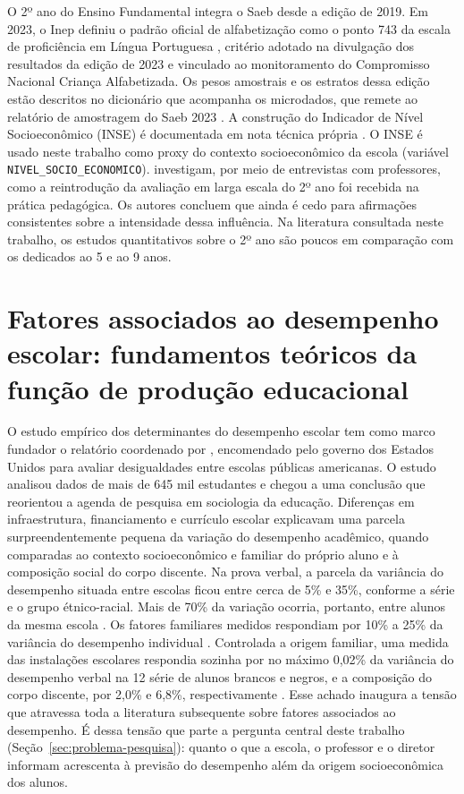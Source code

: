 O 2º ano do Ensino Fundamental integra o Saeb desde a edição de 2019. Em
2023, o Inep definiu o padrão oficial de alfabetização como o ponto 743 da
escala de proficiência em Língua Portuguesa \cite{inep2023alfabetiza},
critério adotado na divulgação dos resultados da edição de 2023 e
vinculado ao monitoramento do Compromisso Nacional Criança Alfabetizada. Os
pesos amostrais e os estratos dessa edição estão descritos no dicionário
que acompanha os microdados, que remete ao relatório de amostragem do Saeb
2023 \cite{inep2026microdados}. A construção do Indicador de Nível
Socioeconômico (INSE) é documentada em nota técnica própria
\cite{inep2024inse}. O INSE é usado neste trabalho como
proxy do contexto socioeconômico da escola (variável
\texttt{NIVEL\_SOCIO\_ECONOMICO}). 
investigam, por meio de entrevistas com professores, como a reintrodução da
avaliação em larga escala do 2º ano foi recebida na prática pedagógica. Os
autores concluem que ainda é cedo para afirmações consistentes sobre a
intensidade dessa influência. Na literatura consultada neste trabalho, os
estudos quantitativos sobre o 2º ano são poucos em comparação com os
dedicados ao 5\textordmasculine{} e ao 9\textordmasculine{} anos.

\section{Fatores associados ao desempenho escolar: fundamentos teóricos da função de produção educacional}
\label{sec:fundamentos-teoricos}

O estudo empírico dos determinantes do desempenho escolar tem como marco
fundador o relatório coordenado por ,
encomendado pelo governo dos Estados Unidos para avaliar desigualdades
entre escolas públicas americanas. O estudo analisou dados de mais de 645
mil estudantes \cite[p.~8]{coleman1966equality} e chegou a uma conclusão
que reorientou a agenda de pesquisa em sociologia da educação. Diferenças
em infraestrutura, financiamento e currículo escolar explicavam uma
parcela surpreendentemente pequena da variação do desempenho acadêmico,
quando comparadas ao contexto socioeconômico e familiar do próprio aluno e
à composição social do corpo discente. Na prova verbal, a parcela da
variância do desempenho situada entre escolas ficou entre cerca de 5\% e
35\%, conforme a série e o grupo étnico-racial. Mais de 70\% da variação
ocorria, portanto, entre alunos da mesma escola
\cite[p.~296]{coleman1966equality}. Os fatores familiares medidos
respondiam por 10\% a 25\% da variância do desempenho individual
\cite[p.~299]{coleman1966equality}. Controlada a origem familiar, uma
medida das instalações escolares respondia sozinha por no máximo 0,02\% da
variância do desempenho verbal na 12\textordfeminine{} série de alunos
brancos e negros, e a composição do corpo discente, por 2,0\% e 6,8\%,
respectivamente \cite[p.~303]{coleman1966equality}. Esse achado inaugura a
tensão que atravessa toda a literatura subsequente sobre fatores
associados ao desempenho. É dessa tensão que parte a pergunta central
deste trabalho (Seção~\ref{sec:problema-pesquisa}): quanto o que a escola,
o professor e o diretor informam acrescenta à previsão do desempenho além
da origem socioeconômica dos alunos.

